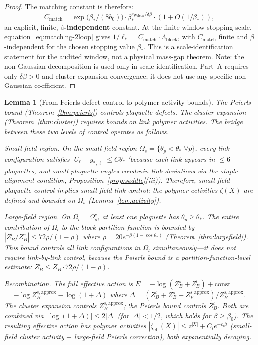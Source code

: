 \documentclass[11pt]{article}
\newtheorem{lemma}[theorem]{Lemma}
\theoremstyle{definition}
\begin{document}
\begin{proof}
The matching constant is therefore:
\begin{equation}\label{eq:matching-2loop}
C_{\mathrm{match}}
=\exp\bigl(\beta_*/(8b_0)\bigr)
\cdot\beta_*^{r_{\mathrm{Wilson}}/\delta\beta}
\cdot(1+O(1/\beta_*)),
\end{equation}
an explicit, finite, \textbf{$\beta$-independent} constant.
At the finite-window stopping scale, equation~\eqref{eq:matching-2loop} gives
$1/\ell_*=C_{\mathrm{match}}\cdot\Lambda_{\mathrm{block}}$,
with $C_{\mathrm{match}}$ finite and $\beta$-independent for the chosen stopping value $\beta_*$.  This is a scale-identification statement for the audited window, not a physical mass-gap theorem.  Note: the non-Gaussian decomposition is used only in scale identification.  Part~A requires only $\delta\beta>0$ and cluster expansion convergence; it does not use any specific non-Gaussian coefficient.
\end{proof}

\begin{lemma}[From Peierls defect control to polymer activity bounds]%
\label{lem:peierls-to-polymer}
The Peierls bound (Theorem~\ref{thm:peierls}) controls
\emph{plaquette} defects.  The cluster expansion
(Theorem~\ref{thm:cluster}) requires bounds on link
polymer activities.  The bridge between these two levels
of control operates as follows.

\emph{Small-field region.}
On the small-field region $\Omega_s=\{\theta_p<\theta_*\;\forall p\}$,
every link configuration satisfies $|U_\ell-y_{*,\ell}|
\le C\theta_*$ (because each link appears in $\le 6$
plaquettes, and small plaquette angles constrain link deviations
via the staple alignment condition,
Proposition~\ref{prop:saddle}(iii)).
Therefore, small-field plaquette control \emph{implies}
small-field link control: the polymer activities
$\zeta(X)$ are defined and bounded on $\Omega_s$
(Lemma~\ref{lem:activity}).

\emph{Large-field region.}
On $\Omega_l=\Omega_s^c$, at least one plaquette has
$\theta_p\ge\theta_*$.  The entire contribution of $\Omega_l$
to the block partition function is bounded by
$|Z_B^l/Z_B^s|\le 72\rho/(1-\rho)$ where
$\rho=20e^{-\beta(1-\cos\theta_*)}$
(Theorem~\ref{thm:largefield}).
This bound controls all link configurations in
$\Omega_l$ simultaneously---it does not require
link-by-link control, because the Peierls bound is a
partition-function-level estimate:
$Z_B^l\le Z_B\cdot 72\rho/(1-\rho)$.

\emph{Recombination.}
The full effective action is $E=-\log(Z_B^s+Z_B^l)+\mathrm{const}$
$=-\log Z_B^{s,\mathrm{approx}}-\log(1+\Delta)$
where $\Delta=(Z_B^l+Z_B^s-Z_B^{s,\mathrm{approx}})
/Z_B^{s,\mathrm{approx}}$.
The cluster expansion controls $Z_B^{s,\mathrm{approx}}$;
the Peierls bound controls $Z_B^l$.  Both are combined via
$|\log(1+\Delta)|\le 2|\Delta|$ (for $|\Delta|<1/2$,
which holds for $\beta\ge\beta_0$).
The resulting effective action has polymer activities
$|\zeta_{\mathrm{eff}}(X)|\le z^{|X|}+C_l e^{-c_l\beta}$
(small-field cluster activity $+$ large-field Peierls
correction), both exponentially decaying.
\end{lemma}
\end{document}
